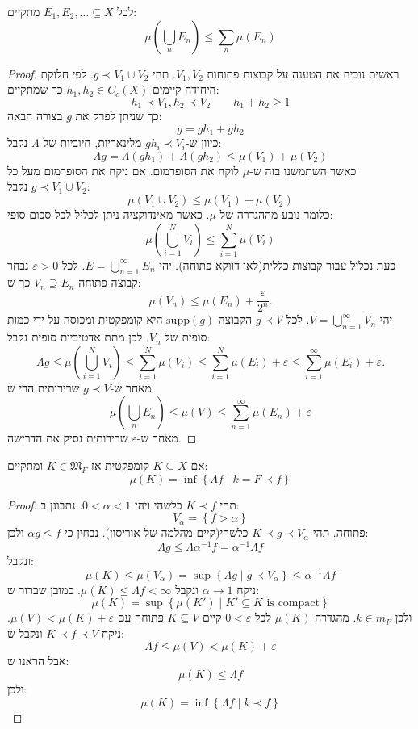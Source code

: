 \documentclass{tstextbook}
\begin{document}
\begin{lemma}[שלב 1]
לכל \(E_{1},E_{2},\dots \subseteq X\) מתקיים:
$$\mu\left( \bigcup_{n}E_{n} \right)\leq \sum_{n}\mu(E_{n})$$

\end{lemma}
\begin{proof}
ראשית נוכיח את הטענה על קבוצות פתוחות \(V_{1},V_{2}\). תהי \(g\prec V_{1} \cup V_{2}\). לפי חלוקת היחידה קיימים \(h_{1},h_{2} \in C_{c}(X)\) כך שמתקיים:
$$h_{1}\prec V_{1},h_{2}\prec V_{2}\qquad h_{1}+h_{2}\geq 1$$
כך שניתן לפרק את \(g\) בצורה הבאה:
$$g=gh_{1}+gh_{2}$$
כיוון ש-\(gh_{i}\prec V_{i}\) מלינאריות, חיוביות של \(\Lambda\) נקבל:
$$\Lambda g=\Lambda(g h_{1})+\Lambda(g h_{2})\leq\mu(V_{1})+\mu(V_{2})$$
כאשר השתמשנו בזה ש-\(\mu\) לוקח את הסופרמום. אם ניקח את הסופרמום מעל כל \(g\prec V_{1}\cup V_{2}\) נקבל:
$$\mu(V_{1}\cup V_{2})\leq\mu(V_{1})+\mu(V_{2})$$
כלומר נובע מההגדרה של \(\mu\). כאשר מאינדוקציה ניתן לכליל לכל סכום סופי:
$$\mu\left(\bigcup_{i=1}^{N}V_{i}\right)\leq\sum_{i=1}^{N}\mu(V_{i})$$
כעת נכליל עבור קבוצות כללית(לאו דווקא פתוחה). יהי \(E=\bigcup_{n=1}^{\infty}E_{n}\). לכל \(\varepsilon> 0\) נבחר קבוצה פתוחה \(V_{n}\supseteq E_{n}\) כך ש:
$$\mu(V_{n})\leq\mu(E_{n})+\frac{\varepsilon}{2^{n}}.$$
יהי \(V=\bigcup_{n=1}^{\infty}V_{n}\). לכל \(g\prec V\) הקבוצה \(\text{supp}(g)\) היא קומפקטית ומכוסה על ידי כמות סופית של \(V_{n}\). לכן מתת אדטיביות סופית נקבל:
$$\Lambda g\leq\mu\left(\bigcup_{i=1}^{N}V_{i}\right)\leq\sum_{i=1}^{N}\mu(V_{i})\leq\sum_{i=1}^{N}\mu(E_{i})+\varepsilon\leq\sum_{i=1}^{\infty}\mu(E_{i})+\varepsilon.$$
מאחר ש-\(g\prec V\) שרירותית הרי ש:
$$\mu\left( \bigcup_{n}E_{n} \right)\leq \mu(V)\leq \sum_{n=1}^{\infty} \mu(E_{n})+\varepsilon $$
מאחר ש-\(\varepsilon\) שרירותית נסיק את הדרישה.

\end{proof}
\begin{lemma}[שלב 2]
אם \(K\subseteq X\) קומפקטית אז \(K \in \mathfrak{M}_{F}\) ומתקיים:
$$\mu(K)=\inf \left\{  \Lambda f\mid k=F\prec f  \right\}$$

\end{lemma}
\begin{proof}
תהי \(K\prec f\) כלשהי ויהי \(0<\alpha < 1\). נתבונן ב:
$$V_{\alpha}=\left\{  f > \alpha  \right\}$$
פתוחה. תהי \(K\prec g\prec V_{\alpha}\) כלשהי(קיים מהלמה של אוריסון). נבחין כי \(\alpha g \leq f\) ולכן:
$$\Lambda g \leq \Lambda \alpha ^{-1} f = \alpha ^{-1} \Lambda f$$
ונקבל:
$$\mu(K)\leq \mu\left( V_{\alpha} \right)=\sup \left\{  \Lambda g \mid g \prec V_{\alpha}  \right\}\leq \alpha ^{-1} \Lambda f$$
ניקח \(\alpha \to 1\) ונקבל \(\mu(K)\leq \Lambda f < \infty\). כמובן שברור ש:
$$\mu(K)=\sup \left\{  \mu(K')\mid K' \subseteq K \text{ is compact}  \right\}$$
ולכן \(k \in m_{F}\). מהגדרה \(\mu(K)\) לכל \(0<\varepsilon\) קיים \(K\subseteq V\) פתוחה עם \(\mu(V)<\mu(K)+\varepsilon\). ניקח \(K \prec f \prec V\) ונקבל ש:
$$\Lambda f \leq \mu(V) < \mu(K)+\varepsilon$$
אבל הראנו ש:
$$\mu(K)\leq \Lambda f$$
ולכן:
$$\mu(K)=\inf \left\{  \Lambda f \mid k \prec f  \right\}$$

\end{proof}
\end{document}
